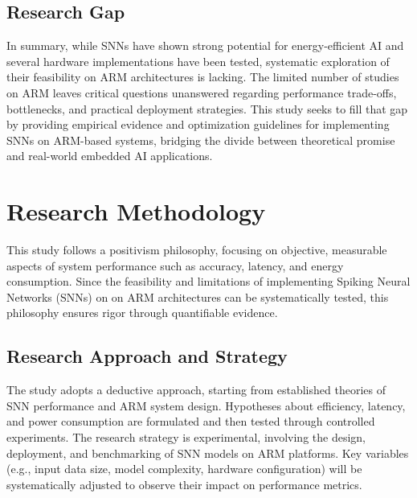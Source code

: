 \documentclass[a4paper,12pt]{article}
\begin{document}
	\subsection{Research Gap}
	In summary, while SNNs have shown strong potential for energy-efficient AI and several hardware implementations have been tested, systematic exploration of their feasibility on ARM architectures is lacking. The limited number of studies on ARM leaves critical questions unanswered regarding performance trade-offs, bottlenecks, and practical deployment strategies. This study seeks to fill that gap by providing empirical evidence and optimization guidelines for implementing SNNs on ARM-based systems, bridging the divide between theoretical promise and real-world embedded AI applications.
	
	\section{Research Methodology}
	This study follows a positivism philosophy, focusing on objective, measurable aspects of system performance such as accuracy, latency, and energy consumption. Since the feasibility and limitations of implementing Spiking Neural Networks (SNNs) on on ARM architectures can be systematically tested, this philosophy ensures rigor through quantifiable evidence.
	
	\subsection{Research Approach and Strategy}
	The study adopts a deductive approach, starting from established theories of SNN performance and ARM system design. Hypotheses about efficiency, latency, and power consumption are formulated and then tested through controlled experiments. The research strategy is experimental, involving the design, deployment, and benchmarking of SNN models on ARM platforms. Key variables (e.g., input data size, model complexity, hardware configuration) will be systematically adjusted to observe their impact on performance metrics.
	
\end{document}
